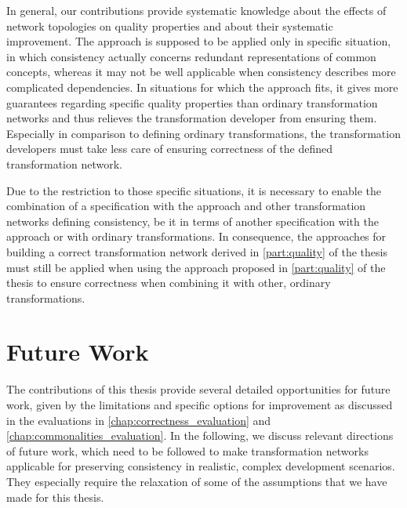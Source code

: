 In general, our contributions provide systematic knowledge about the effects of network topologies on quality properties and about their systematic improvement.
The \commonalities approach is supposed to be applied only in specific situation, in which consistency actually concerns redundant representations of common concepts, whereas it may not be well applicable when consistency describes more complicated dependencies.
In situations for which the approach fits, it gives more guarantees regarding specific quality properties than ordinary transformation networks and thus relieves the transformation developer from ensuring them.
Especially in comparison to defining ordinary transformations, the transformation developers must take less care of ensuring correctness of the defined transformation network.

Due to the restriction to those specific situations, it is necessary to enable the combination of a specification with the \commonalities approach and other transformation networks defining consistency, be it in terms of another specification with the \commonalities approach or with ordinary transformations.
In consequence, the approaches for building a correct transformation network derived in \autoref{part:quality} of the thesis must still be applied when using the \commonalities approach proposed in \autoref{part:quality} of the thesis to ensure correctness when combining it with other, ordinary transformations.


\section{Future Work}
\label{chap:conclusions:futurework}

The contributions of this thesis provide several detailed opportunities for future work, given by the limitations and specific options for improvement as discussed in the evaluations in \autoref{chap:correctness_evaluation} and \autoref{chap:commonalities_evaluation}.
In the following, we discuss relevant directions of future work, which need to be followed to make transformation networks applicable for preserving consistency in realistic, complex development scenarios.
They especially require the relaxation of some of the assumptions that we have made for this thesis.

